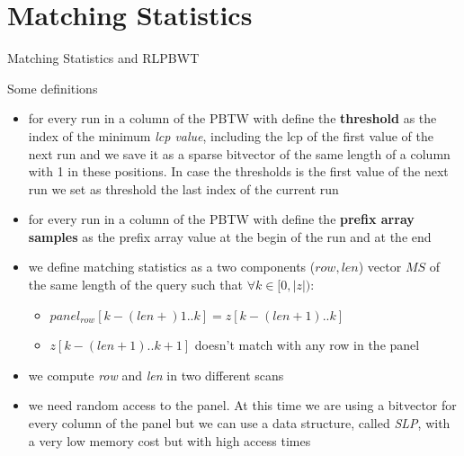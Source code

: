 \documentclass{beamer}
\begin{document}
\section{Matching Statistics}
\begin{frame}{Matching Statistics and RLPBWT}
  \begin{block}{Some definitions}
    \scriptsize
    \begin{itemize}
      \item for every run in a column of the PBTW with define the
      \textbf{threshold} as the index of the minimum \textit{lcp value},
      including the lcp of the first value of the next run and we
      save it as a sparse bitvector of the same length of a column with 1 in
      these positions. In case the thresholds is the first value of the next run
      we set as threshold the last index of the current run
      \item for every run in a column of the PBTW with define the
      \textbf{prefix array samples} as the prefix array value at the begin of the
      run and at the end
      \item we define matching statistics as a two components ($row, len$) vector $MS$ of the
      same length of the query such that $\forall k\in[0,|z|)$: 
      \begin{itemize}
        \item $panel_{row}[k-(len+)1..k]=z[k-(len+1)..k]$
        \item $z[k-(len+1)..k+1]$ doesn't match with any row in the panel 
      \end{itemize}
      \item we compute \textit{row} and \textit{len} in two different scans
      \item we need random access to the panel. At this time we are using a
      bitvector for every column of the panel but we can use a data structure,
      called \textit{SLP}, with a very low memory cost but with high access
      times  
      
    \end{itemize}
  \end{block}
\end{frame}
\end{document}
